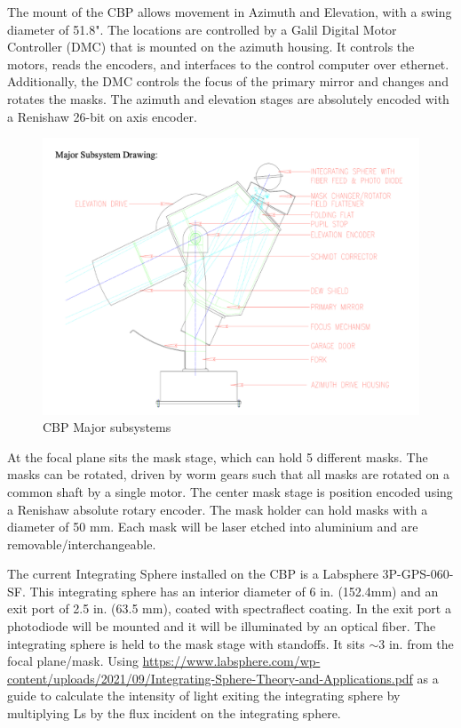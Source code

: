 \documentclass[SE,authoryear,lsstdraft,toc]{lsstdoc}
\begin{document}
The mount of the CBP allows movement in Azimuth and Elevation, with a swing diameter of 51.8". 
The locations are controlled by a Galil Digital Motor Controller (DMC) that is mounted on the azimuth housing. It controls the motors, reads the encoders, and interfaces to the control computer over ethernet. 
Additionally, the DMC controls the focus of the primary mirror and changes and rotates the masks. 
The azimuth and elevation stages are absolutely encoded with a Renishaw 26-bit on axis encoder. 


\begin{figure}[h]
    \centering
    \includegraphics[width=\textwidth]{cbp_drawing.png}
    \caption{CBP Major subsystems}
    \label{fig:cbp_major_subsystems}
\end{figure}

At the focal plane sits the mask stage, which can hold 5 different masks. The masks can be rotated, driven by worm gears such that all masks are rotated on a common shaft by a single motor. The center mask stage is position encoded using a Renishaw absolute rotary encoder. The mask holder can hold masks with a diameter of 50 mm. Each mask will be laser etched into aluminium and are removable/interchangeable. 

The current Integrating Sphere installed on the CBP is a Labsphere 3P-GPS-060-SF. 
This integrating sphere has an interior diameter of 6 in. (152.4mm) and an exit port of 2.5 in. (63.5 mm), coated with spectraflect coating. 
In the exit port a photodiode will be mounted and it will be illuminated by an optical fiber.
The integrating sphere is held to the mask stage with standoffs. 
It sits $\sim 3$ in. from the focal plane/mask. 
Using \url{https://www.labsphere.com/wp-content/uploads/2021/09/Integrating-Sphere-Theory-and-Applications.pdf} as a guide to calculate the intensity of light exiting the integrating sphere by multiplying Ls by the flux incident on the integrating sphere.
\end{document}
